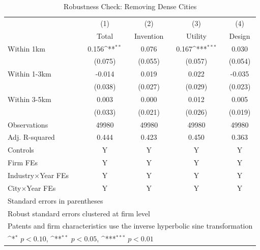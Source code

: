 \begin{table}[!htbp]\centering
\def\sym#1{\ifmmode^{#1}\else\(^{#1}\)\fi}
\caption{Robustness Check: Removing Dense Cities}
\label{tab:RBdense}
\begin{tabular}{l*{4}{c}}
\toprule
            &\multicolumn{1}{c}{(1)}&\multicolumn{1}{c}{(2)}&\multicolumn{1}{c}{(3)}&\multicolumn{1}{c}{(4)}\\
            &\multicolumn{1}{c}{Total}&\multicolumn{1}{c}{Invention}&\multicolumn{1}{c}{Utility}&\multicolumn{1}{c}{Design}\\
\midrule
Within 1km  &       0.156\sym{**} &       0.076         &       0.167\sym{***}&       0.030         \\
            &     (0.075)         &     (0.055)         &     (0.057)         &     (0.054)         \\
\addlinespace
Within 1-3km&      -0.014         &       0.019         &       0.022         &      -0.035         \\
            &     (0.038)         &     (0.027)         &     (0.029)         &     (0.023)         \\
\addlinespace
Within 3-5km&       0.003         &       0.000         &       0.012         &       0.005         \\
            &     (0.033)         &     (0.021)         &     (0.026)         &     (0.019)         \\
\midrule
Observations&       49980         &       49980         &       49980         &       49980         \\
Adj. R-squared&       0.444         &       0.423         &       0.450         &       0.363         \\
Controls    &           Y         &           Y         &           Y         &           Y         \\
Firm FEs    &           Y         &           Y         &           Y         &           Y         \\
Industry$\times$Year FEs&           Y         &           Y         &           Y         &           Y         \\
City$\times$Year FEs&           Y         &           Y         &           Y         &           Y         \\
\bottomrule
\multicolumn{5}{l}{\footnotesize Standard errors in parentheses}\\
\multicolumn{5}{l}{\footnotesize Robust standard errors clustered at firm level}\\
\multicolumn{5}{l}{\footnotesize Patents and firm characteristics use the inverse hyperbolic sine transformation}\\
\multicolumn{5}{l}{\footnotesize \sym{*} \(p<0.10\), \sym{**} \(p<0.05\), \sym{***} \(p<0.01\)}\\
\end{tabular}
\end{table}

